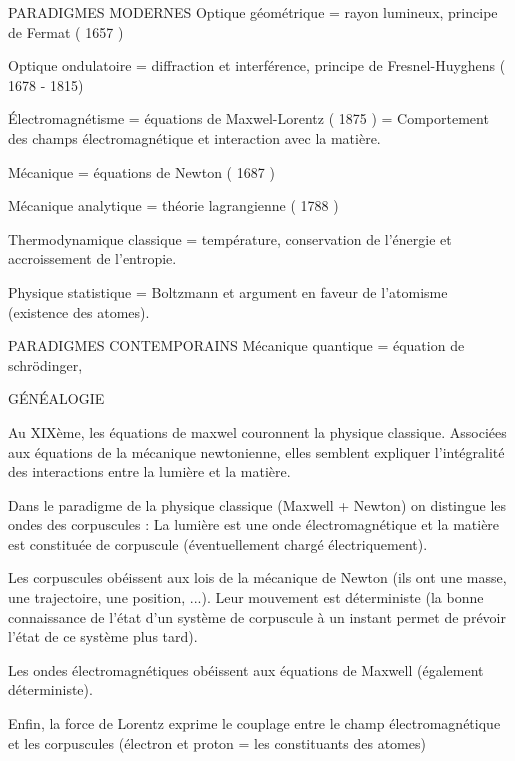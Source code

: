 \begin{comment}
\end{comment}

PARADIGMES MODERNES
	Optique géométrique = rayon lumineux, principe de Fermat ( 1657 )

	Optique ondulatoire = diffraction et interférence, principe de Fresnel-Huyghens ( 1678 - 1815)

	Électromagnétisme =  équations de Maxwel-Lorentz ( 1875 ) = Comportement des champs électromagnétique et interaction avec la matière.

	Mécanique = équations de Newton ( 1687 )

	Mécanique analytique = théorie lagrangienne ( 1788 )

	Thermodynamique classique = température, conservation de l'énergie et accroissement de l'entropie.

	Physique statistique = Boltzmann et argument en faveur de l'atomisme (existence des atomes).


PARADIGMES CONTEMPORAINS
	Mécanique quantique = équation de schrödinger, 

GÉNÉALOGIE

Au XIXème, les équations de maxwel couronnent la physique classique. Associées aux équations de la mécanique newtonienne, elles semblent expliquer l'intégralité des interactions entre la lumière et la matière.

Dans le paradigme de la physique classique (Maxwell + Newton) on distingue les ondes des corpuscules : La lumière est une onde électromagnétique et la matière est constituée de corpuscule (éventuellement chargé électriquement).

Les corpuscules obéissent aux lois de la mécanique de Newton (ils ont une masse, une trajectoire, une position, ...). Leur mouvement est déterministe (la bonne connaissance de l'état d'un système de corpuscule à un instant permet de prévoir l'état de ce système plus tard).

Les ondes électromagnétiques obéissent aux équations de Maxwell (également déterministe).

Enfin, la force de Lorentz exprime le couplage entre le champ électromagnétique et les corpuscules (électron et proton = les constituants des atomes)




\subsection{}\subsection{}
\begin{center}
\end{center}

